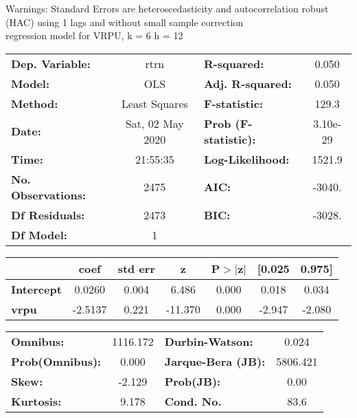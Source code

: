 Warnings: \newline
 [1] Standard Errors are heteroscedasticity and autocorrelation robust (HAC) using 1 lags and without small sample correction\\ 

regression model for VRPU, k = 6 h = 12\begin{center}
\begin{tabular}{lclc}
\toprule
\textbf{Dep. Variable:}    &       rtrn       & \textbf{  R-squared:         } &     0.050   \\
\textbf{Model:}            &       OLS        & \textbf{  Adj. R-squared:    } &     0.050   \\
\textbf{Method:}           &  Least Squares   & \textbf{  F-statistic:       } &     129.3   \\
\textbf{Date:}             & Sat, 02 May 2020 & \textbf{  Prob (F-statistic):} &  3.10e-29   \\
\textbf{Time:}             &     21:55:35     & \textbf{  Log-Likelihood:    } &    1521.9   \\
\textbf{No. Observations:} &        2475      & \textbf{  AIC:               } &    -3040.   \\
\textbf{Df Residuals:}     &        2473      & \textbf{  BIC:               } &    -3028.   \\
\textbf{Df Model:}         &           1      & \textbf{                     } &             \\
\bottomrule
\end{tabular}
\begin{tabular}{lcccccc}
                   & \textbf{coef} & \textbf{std err} & \textbf{z} & \textbf{P$> |$z$|$} & \textbf{[0.025} & \textbf{0.975]}  \\
\midrule
\textbf{Intercept} &       0.0260  &        0.004     &     6.486  &         0.000        &        0.018    &        0.034     \\
\textbf{vrpu}      &      -2.5137  &        0.221     &   -11.370  &         0.000        &       -2.947    &       -2.080     \\
\bottomrule
\end{tabular}
\begin{tabular}{lclc}
\textbf{Omnibus:}       & 1116.172 & \textbf{  Durbin-Watson:     } &    0.024  \\
\textbf{Prob(Omnibus):} &   0.000  & \textbf{  Jarque-Bera (JB):  } & 5806.421  \\
\textbf{Skew:}          &  -2.129  & \textbf{  Prob(JB):          } &     0.00  \\
\textbf{Kurtosis:}      &   9.178  & \textbf{  Cond. No.          } &     83.6  \\
\bottomrule
\end{tabular}
\end{center}

